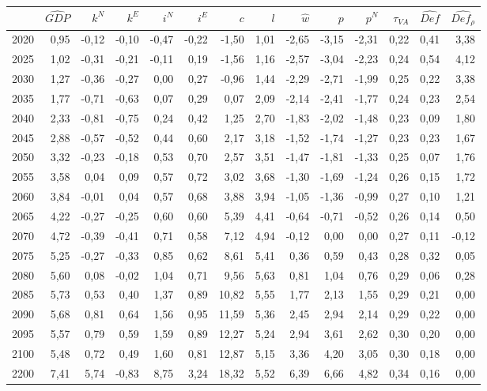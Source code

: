 \begin{tabular}{lrrrrrrrrrrrrr}
\toprule
 & $\hat{GDP}$ & $k^N$ & $k^E$ & $i^N$ & $i^E$ & $c$ & $l$ & $\hat{w}$ & $p$ & $p^N$ & $\tau_{VA}$ & $\hat{Def}$ & $\hat{Def_\rho}$ \\
\midrule
2020 & 0,95 & -0,12 & -0,10 & -0,47 & -0,22 & -1,50 & 1,01 & -2,65 & -3,15 & -2,31 & 0,22 & 0,41 & 3,38 \\
2025 & 1,02 & -0,31 & -0,21 & -0,11 & 0,19 & -1,56 & 1,16 & -2,57 & -3,04 & -2,23 & 0,24 & 0,54 & 4,12 \\
2030 & 1,27 & -0,36 & -0,27 & 0,00 & 0,27 & -0,96 & 1,44 & -2,29 & -2,71 & -1,99 & 0,25 & 0,22 & 3,38 \\
2035 & 1,77 & -0,71 & -0,63 & 0,07 & 0,29 & 0,07 & 2,09 & -2,14 & -2,41 & -1,77 & 0,24 & 0,23 & 2,54 \\
2040 & 2,33 & -0,81 & -0,75 & 0,24 & 0,42 & 1,25 & 2,70 & -1,83 & -2,02 & -1,48 & 0,23 & 0,09 & 1,80 \\
2045 & 2,88 & -0,57 & -0,52 & 0,44 & 0,60 & 2,17 & 3,18 & -1,52 & -1,74 & -1,27 & 0,23 & 0,23 & 1,67 \\
2050 & 3,32 & -0,23 & -0,18 & 0,53 & 0,70 & 2,57 & 3,51 & -1,47 & -1,81 & -1,33 & 0,25 & 0,07 & 1,76 \\
2055 & 3,58 & 0,04 & 0,09 & 0,57 & 0,72 & 3,02 & 3,68 & -1,30 & -1,69 & -1,24 & 0,26 & 0,15 & 1,72 \\
2060 & 3,84 & -0,01 & 0,04 & 0,57 & 0,68 & 3,88 & 3,94 & -1,05 & -1,36 & -0,99 & 0,27 & 0,10 & 1,21 \\
2065 & 4,22 & -0,27 & -0,25 & 0,60 & 0,60 & 5,39 & 4,41 & -0,64 & -0,71 & -0,52 & 0,26 & 0,14 & 0,50 \\
2070 & 4,72 & -0,39 & -0,41 & 0,71 & 0,58 & 7,12 & 4,94 & -0,12 & 0,00 & 0,00 & 0,27 & 0,11 & -0,12 \\
2075 & 5,25 & -0,27 & -0,33 & 0,85 & 0,62 & 8,61 & 5,41 & 0,36 & 0,59 & 0,43 & 0,28 & 0,32 & 0,05 \\
2080 & 5,60 & 0,08 & -0,02 & 1,04 & 0,71 & 9,56 & 5,63 & 0,81 & 1,04 & 0,76 & 0,29 & 0,06 & 0,28 \\
2085 & 5,73 & 0,53 & 0,40 & 1,37 & 0,89 & 10,82 & 5,55 & 1,77 & 2,13 & 1,55 & 0,29 & 0,21 & 0,00 \\
2090 & 5,68 & 0,81 & 0,64 & 1,56 & 0,95 & 11,59 & 5,36 & 2,45 & 2,94 & 2,14 & 0,29 & 0,22 & 0,00 \\
2095 & 5,57 & 0,79 & 0,59 & 1,59 & 0,89 & 12,27 & 5,24 & 2,94 & 3,61 & 2,62 & 0,30 & 0,20 & 0,00 \\
2100 & 5,48 & 0,72 & 0,49 & 1,60 & 0,81 & 12,87 & 5,15 & 3,36 & 4,20 & 3,05 & 0,30 & 0,18 & 0,00 \\
2200 & 7,41 & 5,74 & -0,83 & 8,75 & 3,24 & 18,32 & 5,52 & 6,39 & 6,66 & 4,82 & 0,34 & 0,16 & 0,00 \\
\bottomrule
\end{tabular}
